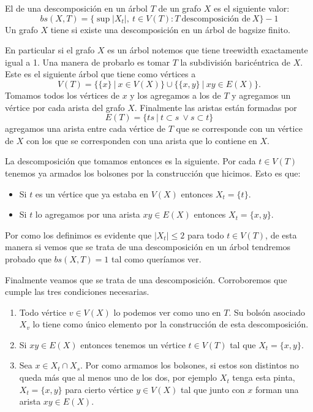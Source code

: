 \documentclass[tesis.tex]{subfiles}
\begin{document}
\begin{deff}
El  de una descomposición en un árbol $T$ de un grafo $X$ es el siguiente valor:
	\begin{equation*}
		bs(X,T) = \{ \sup |X_t|, \ t \in V(T) : T \ \text{descomposición de} \ X  \} - 1
	\end{equation*}
Un grafo $X$ tiene  si existe una descomposición en un árbol de bagsize finito.	
\end{deff}
\begin{obs}
 En particular si el grafo $X$ es un árbol notemos que tiene treewidth exactamente igual a 1.
 Una manera de probarlo es tomar $T$ la subdivisión baricéntrica de $X$. 
 Este es el siguiente árbol que tiene como vértices a 
 \[
 V(T) = \{ \{ x \} \ | \ x \in V(X)  \} \cup \{ \{ x,y \} \ | \ xy \in E(X) \}.
 \]
 Tomamos todos los vértices de $x$ y los agregamos a los de $T$ y agregamos un vértice por cada arista del grafo $X$.
 Finalmente las aristas están formadas por 
 \[
 E(T) = \{  ts \ | \ t \subset s \ \lor s \subset t \}
 \]
 agregamos una arista entre cada vértice de $T$ que se corresponde con un vértice de $X$ con los que se corresponden con una arista que lo contiene en $X$. 
 
 
 La descomposición que tomamos entonces es la siguiente. 
 Por cada $t \in V(T)$ tenemos ya armados los bolsones por la construcción que hicimos. 
 Esto es que:
 \begin{itemize}
 	\item Si $t$ es un vértice que ya estaba en $V(X)$ entonces $X_t = \{ t \}$. 
 	\item Si $t$ lo agregamos por una arista $xy \in E(X)$ entonces $X_t = \{ x,y  \}$.
 \end{itemize}
Por como los definimos es evidente que $|X_t| \le 2$ para todo $t \in V(T)$, de esta manera si vemos que se trata de una descomposición en un árbol tendremos probado que $bs(X,T) = 1$ tal como queríamos ver.

Finalmente veamos que se trata de una descomposición. Corroboremos que cumple las tres condiciones necesarias.
\begin{enumerate}
	\item Todo vértice $v \in V(X)$ lo podemos ver como uno en $T$. Su bolsón asociado $X_v$ lo tiene como único elemento por la construcción de esta descomposición.
	\item Si $xy \in E(X)$ entonces tenemos un vértice $t\in V(T)$ tal que $X_{t} = \{ x,y \}$. 
	\item Sea $x \in X_t \cap X_s$. 
	Por como armamos los bolsones, si estos son distintos no queda más que al menos uno de los dos, por ejemplo $X_t$ tenga esta pinta, $X_t = \{ x,y\}$ para cierto vértice $y \in V(X)$ tal que junto con $x$ forman una arista $xy \in E(X)$.
	

\end{enumerate}
\end{obs}
\end{document}
